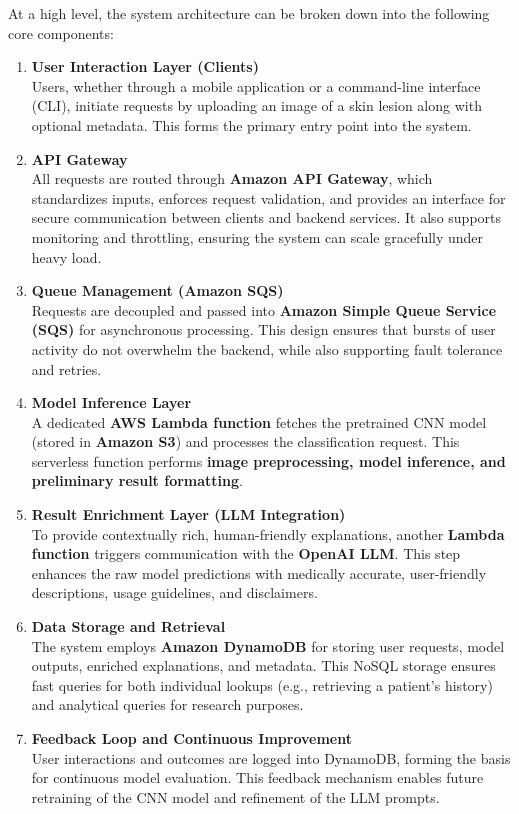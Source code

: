 \documentclass[
  12pt,
  oneside]{article}
\begin{document}
At a high level, the system architecture can be broken down into the
following core components:

\begin{enumerate}
\def\labelenumi{\arabic{enumi}.}
\item
  \textbf{User Interaction Layer (Clients)}\\
  Users, whether through a mobile application or a command-line
  interface (CLI), initiate requests by uploading an image of a skin
  lesion along with optional metadata. This forms the primary entry
  point into the system.
\item
  \textbf{API Gateway}\\
  All requests are routed through \textbf{Amazon API Gateway}, which
  standardizes inputs, enforces request validation, and provides an
  interface for secure communication between clients and backend
  services. It also supports monitoring and throttling, ensuring the
  system can scale gracefully under heavy load.
\item
  \textbf{Queue Management (Amazon SQS)}\\
  Requests are decoupled and passed into \textbf{Amazon Simple Queue
  Service (SQS)} for asynchronous processing. This design ensures that
  bursts of user activity do not overwhelm the backend, while also
  supporting fault tolerance and retries.
\item
  \textbf{Model Inference Layer}\\
  A dedicated \textbf{AWS Lambda function} fetches the pretrained CNN
  model (stored in \textbf{Amazon S3}) and processes the classification
  request. This serverless function performs \textbf{image
  preprocessing, model inference, and preliminary result formatting}.
\item
  \textbf{Result Enrichment Layer (LLM Integration)}\\
  To provide contextually rich, human-friendly explanations, another
  \textbf{Lambda function} triggers communication with the
  \textbf{OpenAI LLM}. This step enhances the raw model predictions with
  medically accurate, user-friendly descriptions, usage guidelines, and
  disclaimers.
\item
  \textbf{Data Storage and Retrieval}\\
  The system employs \textbf{Amazon DynamoDB} for storing user requests,
  model outputs, enriched explanations, and metadata. This NoSQL storage
  ensures fast queries for both individual lookups (e.g., retrieving a
  patient's history) and analytical queries for research purposes.
\item
  \textbf{Feedback Loop and Continuous Improvement}\\
  User interactions and outcomes are logged into DynamoDB, forming the
  basis for continuous model evaluation. This feedback mechanism enables
  future retraining of the CNN model and refinement of the LLM prompts.
\end{enumerate}
\end{document}
